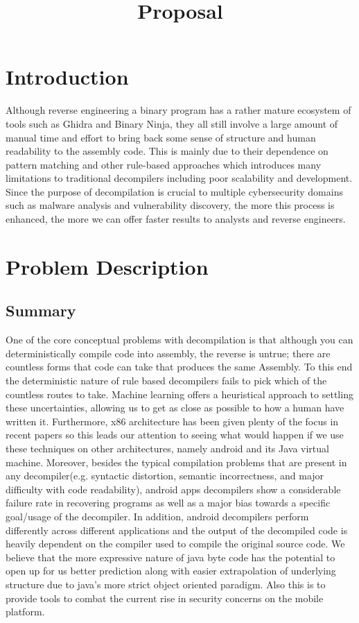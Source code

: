 \documentclass{article}
\author{}
\title{Proposal}
\begin{document}
\maketitle

\tableofcontents


\section{Introduction}
Although reverse engineering a binary program has a rather mature ecosystem of tools such as Ghidra and Binary Ninja, they all still involve a large amount
of manual time and effort to bring back some sense of structure and human readability to the assembly code. This is mainly due to their dependence on pattern matching and other rule-based approaches which introduces many limitations to traditional decompilers including poor scalability and development.
Since the purpose of decompilation is crucial to multiple cybersecurity domains such as malware analysis and vulnerability discovery, the more this process is enhanced, the more we can offer faster results to analysts and reverse engineers.

\section{Problem Description}
\subsection{Summary}
One of the core conceptual problems with decompilation is that although you can deterministically compile code into assembly, the reverse is untrue; there are countless forms that code can take that produces the same Assembly.
To this end the deterministic nature of rule based decompilers fails to pick which of the countless routes to take.
Machine learning offers a heuristical approach to settling these uncertainties, allowing us to get as close as possible to how a human have written it.
Furthermore, x86 architecture has been given plenty of the focus in recent papers so this leads our attention to seeing what would happen if we use these techniques on other architectures, namely android and its Java virtual machine.
Moreover, besides the typical compilation problems that are present in any decompiler(e.g. syntactic distortion, semantic incorrectness, and major difficulty with code readability), android apps decompilers show a considerable failure rate in recovering programs as well as a major bias towards a specific goal/usage of the decompiler.
In addition, android decompilers perform differently across different applications and the output of the decompiled code is heavily dependent on the compiler used to compile the original source code.
We believe that the more expressive nature of java byte code has the potential to open up for us better prediction along with easier extrapolation of underlying structure due to java’s more strict object oriented paradigm.
Also this is to provide tools to combat the current rise in security concerns on the mobile platform.
\end{document}
